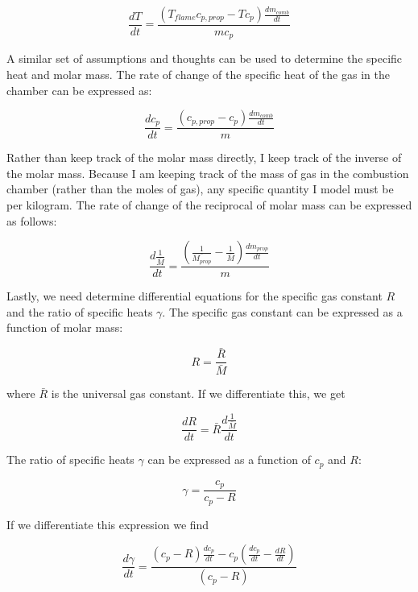\documentclass[12pt, letterpaper]{article}
\begin{document}
\begin{equation}
  \frac{dT}{dt} = \frac{\left( T_{flame} c_{p, prop} - T c_p \right) \frac{dm_{comb}}{dt}}{m c_p}
\end{equation} 

A similar set of assumptions and thoughts can be used to determine the specific heat and molar mass. The rate of change of the specific heat of the gas in the chamber can be expressed as:

\begin{equation}
  \frac{d c_p}{dt} = \frac{\left( c_{p, prop} - c_p \right) \frac{dm_{comb}}{dt}}{m}
\end{equation}

Rather than keep track of the molar mass directly, I keep track of the inverse of the molar mass. Because I am keeping track of the mass of gas in the combustion chamber (rather than the moles of gas), any specific quantity I model must be per kilogram. The rate of change of the reciprocal of molar mass can be expressed as follows:

\begin{equation}
  \frac{d \frac{1}{\bar{M}}}{dt} = \frac{ \left( \frac{1}{\bar{M_{prop}}} - \frac{1}{\bar{M}}\right) \frac{dm_{prop}}{dt}}{m}
\end{equation}

Lastly, we need determine differential equations for the specific gas constant $R$ and the ratio of specific heats $\gamma$. The specific gas constant can be expressed as a function of molar mass:

\begin{equation}
  R = \frac{\bar{R}}{\bar{M}}
\end{equation}

where $\bar{R}$ is the universal gas constant. If we differentiate this, we get

\begin{equation}
  \frac{dR}{dt} = \bar{R} \frac{d \frac{1}{\bar{M}}}{dt}
\end{equation}

The ratio of specific heats $\gamma$ can be expressed as a function of $c_p$ and $R$:

\begin{equation}
  \gamma = \frac{c_p}{c_p - R}
\end{equation}

If we differentiate this expression we find

\begin{equation}
  \frac{d \gamma}{dt} = \frac{ \left( c_p - R \right) \frac{d c_p}{dt} - c_p \left( \frac{d c_p}{dt} - \frac{dR}{dt} \right)}{\left( c_p - R \right)}
\end{equation}
\end{document}
